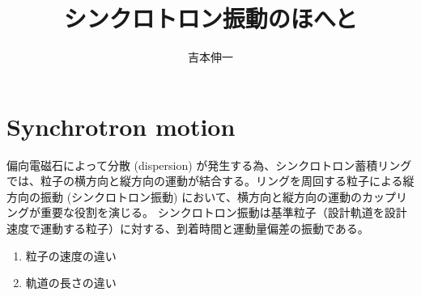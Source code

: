 \documentclass[10pt,a4paper]{ltjsarticle}
\begin{document}
\title{シンクロトロン振動のほへと}
\author{吉本伸一}
\maketitle
\tableofcontents
\clearpage

\section{Synchrotron motion}
偏向電磁石によって分散 (dispersion) が発生する為、シンクロトロン蓄積リングでは、粒子の横方向と縦方向の運動が結合する。リングを周回する粒子による縦方向の振動 (シンクロトロン振動) において、横方向と縦方向の運動のカップリングが重要な役割を演じる。
シンクロトロン振動は基準粒子（設計軌道を設計速度で運動する粒子）に対する、到着時間と運動量偏差の振動である。

\begin{enumerate}
    \item 粒子の速度の違い
    \item 軌道の長さの違い
\end{enumerate}
\end{document}

